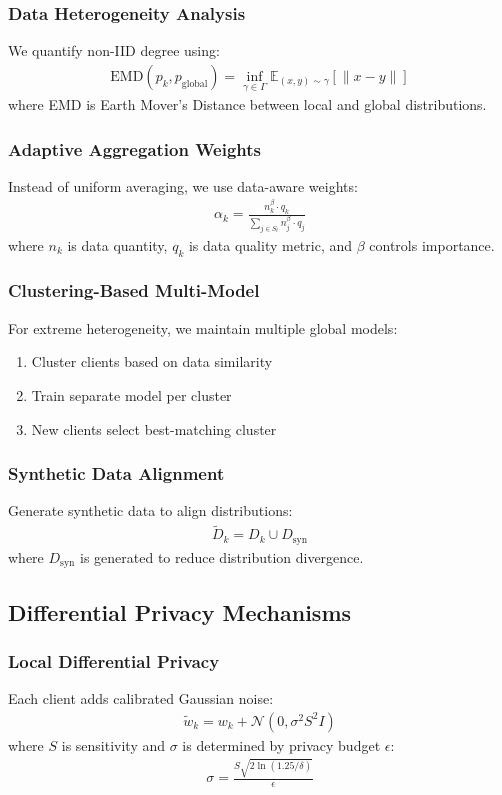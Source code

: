 \documentclass[journal]{IEEEtran}
\begin{document}
\subsubsection{Data Heterogeneity Analysis}
We quantify non-IID degree using:
\begin{align}
\text{EMD}(p_k, p_{\text{global}}) = \inf_{\gamma \in \Gamma} \mathbb{E}_{(x,y) \sim \gamma}[\|x - y\|]
\end{align}
where EMD is Earth Mover's Distance between local and global distributions.

\subsubsection{Adaptive Aggregation Weights}
Instead of uniform averaging, we use data-aware weights:
\begin{align}
\alpha_k = \frac{n_k^\beta \cdot q_k}{\sum_{j \in S_t} n_j^\beta \cdot q_j}
\end{align}
where $n_k$ is data quantity, $q_k$ is data quality metric, and $\beta$ controls importance.

\subsubsection{Clustering-Based Multi-Model}
For extreme heterogeneity, we maintain multiple global models:
\begin{enumerate}
\item Cluster clients based on data similarity
\item Train separate model per cluster
\item New clients select best-matching cluster
\end{enumerate}

\subsubsection{Synthetic Data Alignment}
Generate synthetic data to align distributions:
\begin{align}
\tilde{D}_k = D_k \cup D_{\text{syn}}
\end{align}
where $D_{\text{syn}}$ is generated to reduce distribution divergence.

\subsection{Differential Privacy Mechanisms}

\subsubsection{Local Differential Privacy}
Each client adds calibrated Gaussian noise:
\begin{align}
\tilde{w}_k = w_k + \mathcal{N}(0, \sigma^2 S^2 I)
\end{align}
where $S$ is sensitivity and $\sigma$ is determined by privacy budget $\epsilon$:
\begin{align}
\sigma = \frac{S\sqrt{2\ln(1.25/\delta)}}{\epsilon}
\end{align}
\end{document}
